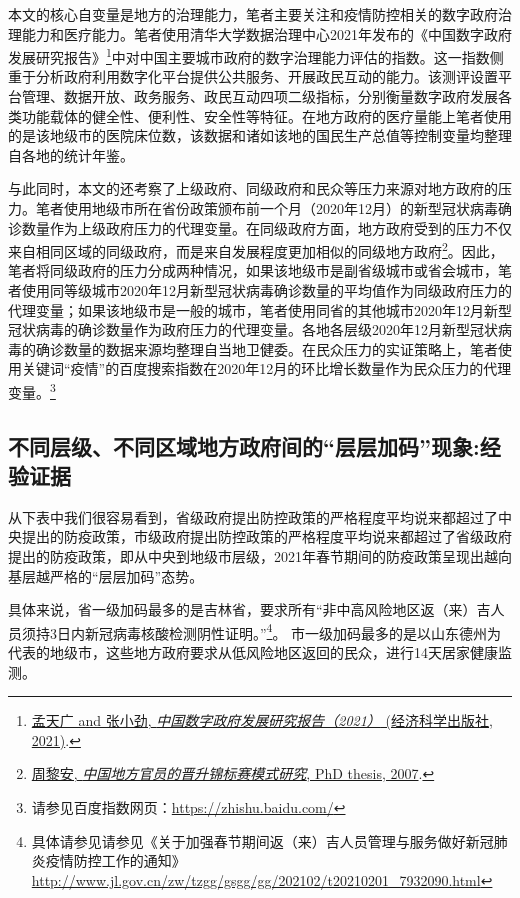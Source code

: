 \documentclass[
  12pt,
]{ctexart}
\begin{document}
本文的核心自变量是地方的治理能力，笔者主要关注和疫情防控相关的数字政府治理能力和医疗能力。笔者使用清华大学数据治理中心2021年发布的《中国数字政府发展研究报告》\footnote{\protect\hyperlink{ref-MengTianGuangZhangXiaoJing2021}{孟天广 and 张小劲, \emph{中国数字政府发展研究报告（2021）} ({经济科学出版社}, 2021)}.}中对中国主要城市政府的数字治理能力评估的指数。这一指数侧重于分析政府利用数字化平台提供公共服务、开展政民互动的能力。该测评设置平台管理、数据开放、政务服务、政民互动四项二级指标，分别衡量数字政府发展各类功能载体的健全性、便利性、安全性等特征。在地方政府的医疗量能上笔者使用的是该地级市的医院床位数，该数据和诸如该地的国民生产总值等控制变量均整理自各地的统计年鉴。

与此同时，本文的还考察了上级政府、同级政府和民众等压力来源对地方政府的压力。笔者使用地级市所在省份政策颁布前一个月（2020年12月）的新型冠状病毒确诊数量作为上级政府压力的代理变量。在同级政府方面，地方政府受到的压力不仅来自相同区域的同级政府，而是来自发展程度更加相似的同级地方政府\footnote{\protect\hyperlink{ref-ZhouLiAn2007}{周黎安, \emph{中国地方官员的晋升锦标赛模式研究}, PhD thesis, 2007}.}。因此，笔者将同级政府的压力分成两种情况，如果该地级市是副省级城市或省会城市，笔者使用同等级城市2020年12月新型冠状病毒确诊数量的平均值作为同级政府压力的代理变量；如果该地级市是一般的城市，笔者使用同省的其他城市2020年12月新型冠状病毒的确诊数量作为政府压力的代理变量。各地各层级2020年12月新型冠状病毒的确诊数量的数据来源均整理自当地卫健委。在民众压力的实证策略上，笔者使用关键词``疫情''的百度搜索指数在2020年12月的环比增长数量作为民众压力的代理变量。\footnote{请参见百度指数网页：\url{https://zhishu.baidu.com/}}

\hypertarget{ux4e0dux540cux5c42ux7ea7ux4e0dux540cux533aux57dfux5730ux65b9ux653fux5e9cux95f4ux7684ux5c42ux5c42ux52a0ux7801ux73b0ux8c61ux7ecfux9a8cux8bc1ux636e}{%
\subsection{不同层级、不同区域地方政府间的``层层加码''现象:经验证据}\label{ux4e0dux540cux5c42ux7ea7ux4e0dux540cux533aux57dfux5730ux65b9ux653fux5e9cux95f4ux7684ux5c42ux5c42ux52a0ux7801ux73b0ux8c61ux7ecfux9a8cux8bc1ux636e}}

从下表中我们很容易看到，省级政府提出防控政策的严格程度平均说来都超过了中央提出的防疫政策，市级政府提出防控政策的严格程度平均说来都超过了省级政府提出的防疫政策，即从中央到地级市层级，2021年春节期间的防疫政策呈现出越向基层越严格的``层层加码''态势。

具体来说，省一级加码最多的是吉林省，要求所有``非中高风险地区返（来）吉人员须持3日内新冠病毒核酸检测阴性证明。''\footnote{具体请参见请参见《关于加强春节期间返（来）吉人员管理与服务做好新冠肺炎疫情防控工作的通知》\url{http://www.jl.gov.cn/zw/tzgg/gsgg/gg/202102/t20210201_7932090.html}}。 市一级加码最多的是以山东德州为代表的地级市，这些地方政府要求从低风险地区返回的民众，进行14天居家健康监测。
\end{document}
